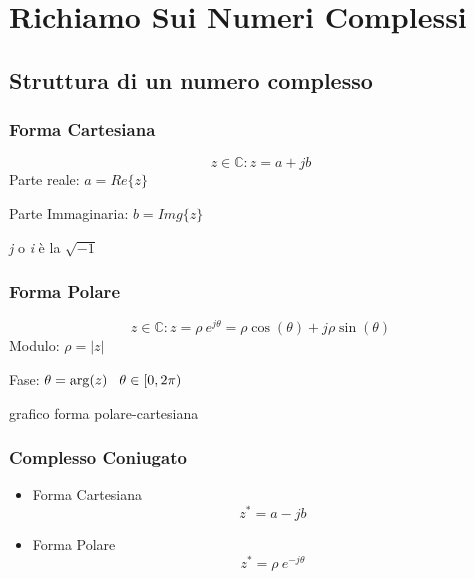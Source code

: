 \section{Richiamo Sui Numeri Complessi}
\subsection{Struttura di un numero complesso}

    \subsubsection{Forma Cartesiana}
            \begin{center}
                \[
                  z \in \mathbb{C} : z = a + jb
                \]
                Parte reale: $a=Re\{z\}$


                \vspace{0.1cm}
                Parte Immaginaria: $b=Img\{z\}$

                \vspace{0.1cm}
                {\em j} o {\em i} è la $\sqrt{-1}$  
            \end{center}
            
    \subsubsection{Forma Polare}
        \begin{center}
            \[
                z \in \mathbb{C} : z = \rho \ e^{j\theta} = \rho \cos(\theta) + j\rho\sin(\theta)
            \]
            Modulo: $\rho = |z|$


            \vspace{0.1cm}
            Fase: $\theta = \arg(z) \hspace{0.3cm} \theta \in [0,2\pi)$
        \end{center}    
        grafico forma polare-cartesiana
        
    \subsubsection{Complesso Coniugato}
        \begin{itemize}
            \item {Forma Cartesiana   
                    \[
                        z^* = a - jb
                    \]
            }
            \item {Forma Polare
                    \[
                        z^* = \rho \ e^{-j\theta}
                    \]
            }           
        \end{itemize}


